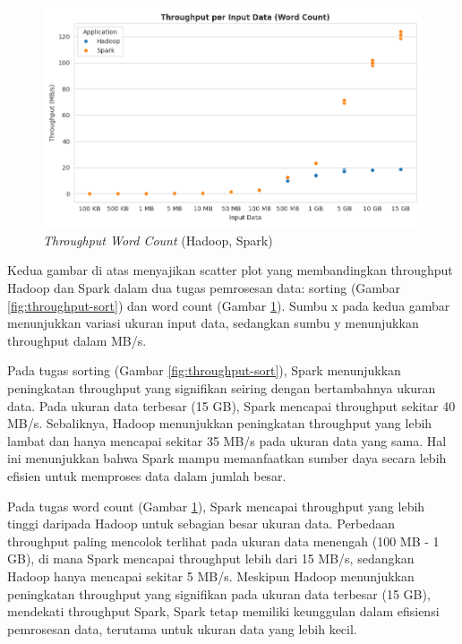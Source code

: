 \begin{figure}[h]
    \centering
    \includegraphics[width=1\textwidth]{figures/ch04/1-throughput-wordcount.png}
    \caption{\textit{Throughput Word Count} (Hadoop, Spark)}
    \label{fig:throughput-wordcount}
\end{figure}
Kedua gambar di atas menyajikan scatter plot yang membandingkan throughput Hadoop dan Spark dalam dua tugas pemrosesan data: sorting (Gambar \ref{fig:throughput-sort}) dan word count (Gambar \ref{fig:throughput-wordcount}). Sumbu x pada kedua gambar menunjukkan variasi ukuran input data, sedangkan sumbu y menunjukkan throughput dalam MB/s. 

Pada tugas sorting (Gambar \ref{fig:throughput-sort}), Spark menunjukkan peningkatan throughput yang signifikan seiring dengan bertambahnya ukuran data. Pada ukuran data terbesar (15 GB), Spark mencapai throughput sekitar 40 MB/s. Sebaliknya, Hadoop menunjukkan peningkatan throughput yang lebih lambat dan hanya mencapai sekitar 35 MB/s pada ukuran data yang sama. Hal ini menunjukkan bahwa Spark mampu memanfaatkan sumber daya secara lebih efisien untuk memproses data dalam jumlah besar.

Pada tugas word count (Gambar \ref{fig:throughput-wordcount}), Spark mencapai throughput yang lebih tinggi daripada Hadoop untuk sebagian besar ukuran data. Perbedaan throughput paling mencolok terlihat pada ukuran data menengah (100 MB - 1 GB), di mana Spark mencapai throughput lebih dari 15 MB/s, sedangkan Hadoop hanya mencapai sekitar 5 MB/s. Meskipun Hadoop menunjukkan peningkatan throughput yang signifikan pada ukuran data terbesar (15 GB), mendekati throughput Spark, Spark tetap memiliki keunggulan dalam efisiensi pemrosesan data, terutama untuk ukuran data yang lebih kecil.

